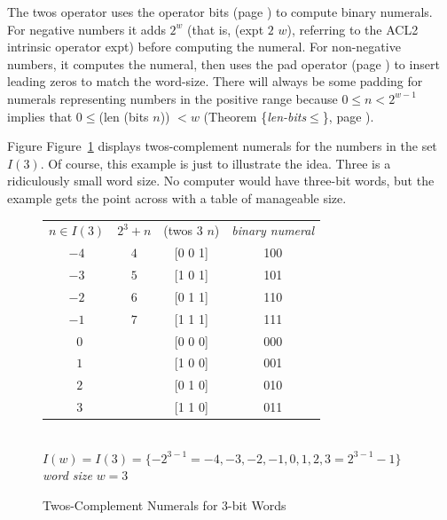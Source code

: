 The twos operator uses the operator bits (page \pageref{bits-defun})
to compute binary numerals.
For negative numbers it adds $2^w$
(that is, (expt $2$ $w$), referring to the ACL2 intrinsic operator expt)
before computing the numeral.
For non-negative numbers, it computes the numeral,
then uses the pad operator (page \pageref{pad-defun})
to insert leading zeros to match the word-size.
There will always be some padding for numerals representing
numbers in the positive range because
$0 \le n < 2^{w-1}$ implies that
$0 \le $(len (bits $n$)) $< w$
(Theorem \{\emph{len-bits}$\le$\}, page \pageref{len-bitsLE}).

Figure Figure~\ref{fig:2s-comp-3bit} displays
twos-complement numerals for the numbers in the set $I(3)$.
Of course, this example is just to illustrate the idea.
Three is a ridiculously small word size.
No computer would have three-bit words,
but the example gets the point across with a table of manageable size.

\begin{figure}
\begin{center}
\begin{tabular}{cccc}
 $n \in I(3)$ & $2^3+n$  & (twos $3$ $n$)   & \emph{binary numeral} \\
 $-4$         & $4$      & [0 0 1]          & 100                   \\
 $-3$         & $5$      & [1 0 1]          & 101                   \\
 $-2$         & $6$      & [0 1 1]          & 110                   \\
 $-1$         & $7$      & [1 1 1]          & 111                   \\
 $~~0$        &          & [0 0 0]          & 000                   \\
 $~~1$        &          & [1 0 0]          & 001                   \\
 $~~2$        &          & [0 1 0]          & 010                   \\
 $~~3$        &          & [1 1 0]          & 011                   \\
\end{tabular}
\\ $I(w) = I(3) = \{-2^{3-1}=-4, -3, -2, -1, 0, 1, 2, 3=2^{3-1}-1\}$
\\ \emph{word size} $w = 3$
\end{center}
\caption{Twos-Complement Numerals for 3-bit Words}
\label{fig:2s-comp-3bit}
\end{figure}

